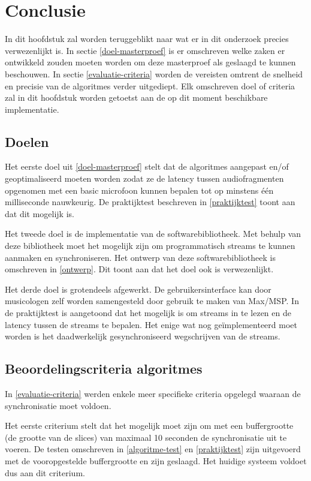 \chapter{Conclusie}

In dit hoofdstuk zal worden teruggeblikt naar wat er in dit onderzoek precies verwezenlijkt is. In sectie \ref{doel-masterproef} is er omschreven welke zaken er ontwikkeld zouden moeten worden om deze masterproef als geslaagd te kunnen beschouwen. In sectie \ref{evaluatie-criteria} worden de vereisten omtrent de snelheid en precisie van de algoritmes verder uitgediept. Elk omschreven doel of criteria zal in dit hoofdstuk worden getoetst aan de op dit moment beschikbare implementatie.

\section{Doelen}

Het eerste doel uit \ref{doel-masterproef} stelt dat de algoritmes aangepast en/of geoptimaliseerd moeten worden zodat ze de latency tussen audiofragmenten opgenomen met een basic microfoon kunnen bepalen tot op minstens één milliseconde nauwkeurig. De praktijktest beschreven in \ref{praktijktest} toont aan dat dit mogelijk is.

Het tweede doel is de implementatie van de softwarebibliotheek. Met behulp van deze bibliotheek moet het mogelijk zijn om programmatisch streams te kunnen aanmaken en synchroniseren. Het ontwerp van deze softwarebibliotheek is omschreven in \ref{ontwerp}. Dit toont aan dat het doel ook is verwezenlijkt.

Het derde doel is grotendeels afgewerkt. De gebruikersinterface kan door musicologen zelf worden samengesteld door gebruik te maken van Max/MSP. In de praktijktest is aangetoond dat het mogelijk is om streams in te lezen en de latency tussen de streams te bepalen. Het enige wat nog geïmplementeerd moet worden is het daadwerkelijk gesynchroniseerd wegschrijven van de streams.

\section{Beoordelingscriteria algoritmes}

In \ref{evaluatie-criteria} werden enkele meer specifieke criteria opgelegd waaraan de synchronisatie moet voldoen.

Het eerste criterium stelt dat het mogelijk moet zijn om met een buffergrootte (de grootte van de slices) van maximaal 10 seconden de synchronisatie uit te voeren. De testen omschreven in \ref{algoritme-test} en \ref{praktijktest} zijn uitgevoerd met de vooropgestelde buffergrootte en zijn geslaagd. Het huidige systeem voldoet dus aan dit criterium.

